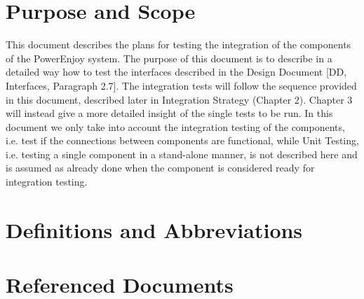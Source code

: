 \section{Purpose and Scope}
This document describes the plans for testing the integration of the components of the PowerEnjoy system. The purpose of this document is to describe in a detailed way how to test the interfaces described in the Design Document [DD, Interfaces, Paragraph 2.7]. The integration tests will follow the sequence provided in this document, described later in Integration Strategy (Chapter 2). Chapter 3 will instead give a more detailed insight of the single tests to be run.
\newline
In this document we only take into account the integration testing of the components, i.e. test if the connections between components are functional, while Unit Testing, i.e. testing a single component in a stand-alone manner, is not described here and is assumed as already done when the component is considered ready for integration testing.

\section{Definitions and Abbreviations}
\section{Referenced Documents}





